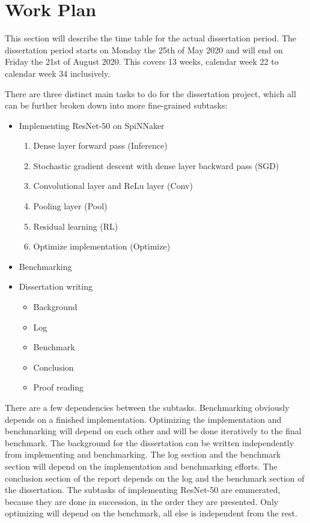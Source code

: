 \documentclass{article}
\begin{document}

\section{Work Plan} %
\label{sec:work_plan}


This section will describe the time table for the actual
dissertation period.
The dissertation period starts on Monday the 25th of May
2020 and will end on Friday the 21st of August 2020.
This covers 13 weeks, calendar week 22 to calendar week 34
inclusively.

There are three distinct main tasks to do for the
dissertation project, which all can be further broken
down into more fine-grained subtasks:
\begin{itemize}
  \item Implementing ResNet-50 on SpiNNaker
    \begin{enumerate}
      \item Dense layer forward pass (Inference)
        \citep[see][]{goodfellow2016}
      \item Stochastic gradient descent with dense layer
        backward pass (SGD) \citep[see][]{goodfellow2016}
      \item Convolutional layer and ReLu layer (Conv)
        \citep[see][]{goodfellow2016}
      \item Pooling layer (Pool)
        \citep[see][]{goodfellow2016}
      \item Residual learning (RL)
        \citep[see][]{he_et_al_2015}
      \item Optimize implementation (Optimize)
    \end{enumerate}
  \item Benchmarking
  \item Dissertation writing
    \begin{itemize}
      \item Background
      \item Log
      \item Benchmark
      \item Conclusion
      \item Proof reading
    \end{itemize}
\end{itemize}
There are a few dependencies between the subtasks.
Benchmarking obviously depends on a finished
implementation.
Optimizing the implementation and benchmarking will depend
on each other and will be done iteratively to the final
benchmark.
The background for the dissertation can be written
independently from implementing and benchmarking.
The log section and the benchmark section will depend on
the implementation and benchmarking efforts.
The conclusion section of the report depends on the log and
the benchmark section of the dissertation.
The subtasks of implementing ResNet-50 are enumerated,
because they are done in succession, in the order they
are presented.
Only optimizing will depend on the benchmark, all else is
independent from the rest.
\end{document}
